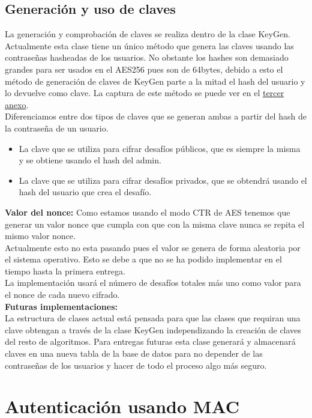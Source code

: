 \documentclass[a4paper,11pt]{article}
\begin{document}
\subsection{Generación y uso de claves}
\label{sec:generacionUsoDeClaves}
La generación y comprobación de claves se realiza dentro de la clase KeyGen. Actualmente esta clase tiene un único método que genera las claves usando las contraseñas hasheadas de los usuarios. No obstante los hashes son demasiado grandes para ser usados en el AES256 pues son de 64bytes, debido a esto el método de generación de claves de KeyGen parte a la mitad el hash del usuario y lo devuelve como clave. La captura de este método se puede ver en el \hyperref[sec:funcionesKeyGen]{tercer anexo}. \\

Diferenciamos entre dos tipos de claves que se generan ambas a partir del hash de la contraseña de un usuario. 
\begin{itemize}
\item La clave que se utiliza para cifrar desafíos públicos, que es siempre la misma y se obtiene usando el hash del admin.
\item La clave que se utiliza para cifrar desafíos privados, que se obtendrá usando el hash del usuario que crea el desafío.
\end{itemize}


\textbf{Valor del nonce:} Como estamos usando el modo CTR de AES tenemos que generar un valor nonce que cumpla con que con la misma clave nunca se repita el mismo valor nonce. \\ 
Actualmente esto no esta pasando pues el valor se genera de forma aleatoria por el sistema operativo. Esto se debe a que no se ha podido implementar en el tiempo hasta la primera entrega.\\
La implementación usará el número de desafíos totales más uno como valor para el nonce de cada nuevo cifrado. \\ 


\textbf{Futuras implementaciones:}\\ 
La estructura de clases actual está pensada para que las clases que requiran una clave obtengan a través de la clase KeyGen independizando la creación de claves del resto de algoritmos. Para entregas futuras esta clase generará y almacenará claves en una nueva tabla de la base de datos para no depender de las contraseñas de los usuarios y hacer de todo el proceso algo más seguro. 

\section{Autenticación usando MAC}
\end{document}
